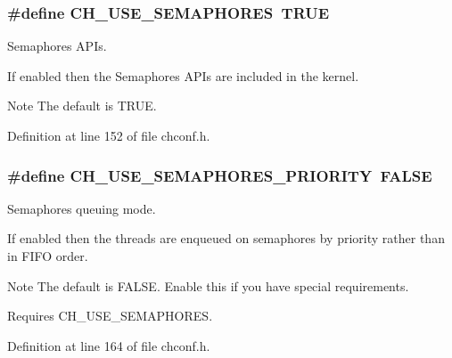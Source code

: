 \subsubsection[{C\+H\+\_\+\+U\+S\+E\+\_\+\+S\+E\+M\+A\+P\+H\+O\+R\+E\+S}]{\setlength{\rightskip}{0pt plus 5cm}\#define C\+H\+\_\+\+U\+S\+E\+\_\+\+S\+E\+M\+A\+P\+H\+O\+R\+E\+S~T\+R\+U\+E}\label{group__config_gab88f410fdc6a67192194a8431d991b27}


Semaphores A\+P\+Is. 

If enabled then the Semaphores A\+P\+Is are included in the kernel.

\begin{DoxyNote}{Note}
The default is {\ttfamily T\+R\+U\+E}. 
\end{DoxyNote}


Definition at line 152 of file chconf.\+h.

\hypertarget{group__config_ga866568c0387963f11c078a8d939c2284}{}
\subsubsection[{C\+H\+\_\+\+U\+S\+E\+\_\+\+S\+E\+M\+A\+P\+H\+O\+R\+E\+S\+\_\+\+P\+R\+I\+O\+R\+I\+T\+Y}]{\setlength{\rightskip}{0pt plus 5cm}\#define C\+H\+\_\+\+U\+S\+E\+\_\+\+S\+E\+M\+A\+P\+H\+O\+R\+E\+S\+\_\+\+P\+R\+I\+O\+R\+I\+T\+Y~F\+A\+L\+S\+E}\label{group__config_ga866568c0387963f11c078a8d939c2284}


Semaphores queuing mode. 

If enabled then the threads are enqueued on semaphores by priority rather than in F\+I\+F\+O order.

\begin{DoxyNote}{Note}
The default is {\ttfamily F\+A\+L\+S\+E}. Enable this if you have special requirements. 

Requires {\ttfamily C\+H\+\_\+\+U\+S\+E\+\_\+\+S\+E\+M\+A\+P\+H\+O\+R\+E\+S}. 
\end{DoxyNote}


Definition at line 164 of file chconf.\+h.

\hypertarget{group__config_gae9e6ff0fe1964761ea6e1bce51d8ee59}{}
